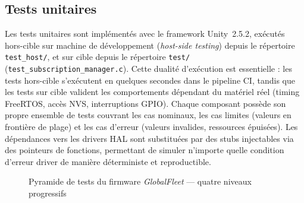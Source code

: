 \subsection{Tests unitaires}
\label{subsec:unit}

Les tests unitaires sont implémentés avec le framework Unity~2.5.2,
exécutés hors-cible sur machine de développement (\textit{host-side
testing}) depuis le répertoire \texttt{test\_host/}, et sur cible
depuis le répertoire \texttt{test/} (\texttt{test\_subscription\_manager.c}).
Cette dualité d'exécution est essentielle : les tests hors-cible
s'exécutent en quelques secondes dans le pipeline CI, tandis que les
tests sur cible valident les comportements dépendant du matériel
réel (timing FreeRTOS, accès NVS, interruptions GPIO). Chaque
composant possède son propre ensemble de tests couvrant les cas
nominaux, les cas limites (valeurs en frontière de plage) et les cas
d'erreur (valeurs invalides, ressources épuisées). Les dépendances
vers les drivers HAL sont substituées par des stubs injectables via
des pointeurs de fonctions, permettant de simuler n'importe quelle
condition d'erreur driver de manière déterministe et reproductible.

\begin{figure}[H]
\centering
{}
\caption{Pyramide de tests du firmware \textit{GlobalFleet} — quatre niveaux progressifs}
\label{fig:test_pyramid}
\end{figure}

